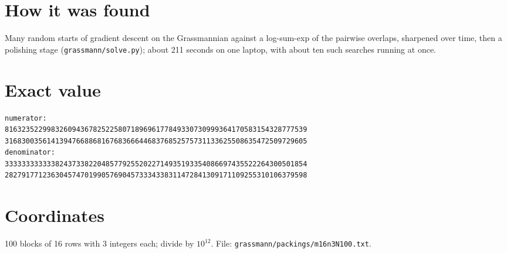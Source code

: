 \documentclass[11pt,a4paper]{article}
\begin{document}
\section{How it was found}
Many random starts of gradient descent on the Grassmannian against a log-sum-exp of the pairwise overlaps, sharpened over time, then a polishing stage (\texttt{grassmann/solve.py}); about 211 seconds on one laptop, with about ten such searches running at once.


\appendix
\section{Exact value}
{\small
\begin{verbatim}
numerator:
816323522998326094367825225807189696177849330730999364170583154328777539
316830035614139476688681676836664468376852575731133625508635472509729605
denominator:
333333333333824373382204857792552022714935193354086697435522264300501854
282791771236304574701990576904573334338311472841309171109255310106379598
\end{verbatim}}

\section{Coordinates}
100 blocks of 16 rows with 3 integers each; divide by $10^{12}$. File: \texttt{grassmann/packings/m16n3N100.txt}.
{\tiny
\begin{multicols}{3}
\end{multicols}}
\end{document}
